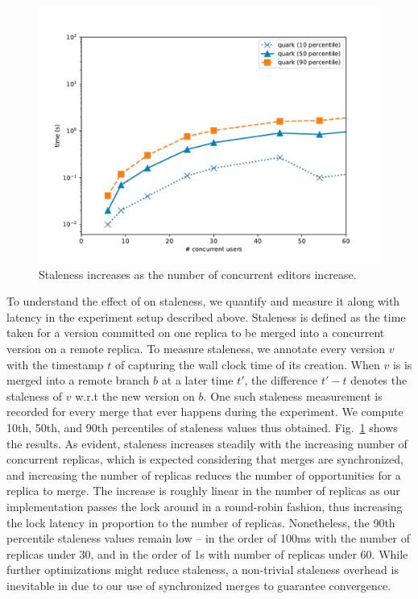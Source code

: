 \begin{figure}[ht]
  \centering
    \includegraphics[scale=0.4]{Figures/monkey_staleness}
\caption{Staleness increases as the number of concurrent editors
  increase.}
\label{fig:monkey-staleness}
  \vspace*{-0.2in}
\end{figure}

To understand the effect of \quark on
staleness, we quantify and measure it along with latency in the
experiment setup described above. Staleness is defined as the time
taken for a version committed on one replica to be merged into a
concurrent version on a remote replica. To measure staleness, we
annotate every version $v$ with the timestamp $t$ of capturing the
wall clock time of its creation. When $v$ is is merged into a remote
branch $b$ at a later time $t'$, the difference $t' - t$ denotes the
staleness of $v$ w.r.t the new version on $b$. One such staleness
measurement is recorded for every merge that ever happens during the
experiment. We compute 10th, 50th, and 90th percentiles of staleness
values thus obtained. Fig.~\ref{fig:monkey-staleness} shows the
results. As evident, staleness increases steadily with the increasing
number of concurrent replicas, which is expected considering that
merges are synchronized, and increasing the number of replicas reduces
the number of opportunities for a replica to merge. The increase is
roughly linear in the number of replicas as our implementation passes
the lock around in a round-robin fashion, thus increasing the lock
latency in proportion to the number of replicas. Nonetheless, the 90th
percentile staleness values remain low -- in the order of 100ms with
the number of replicas under 30, and in the order of 1s with number of
replicas under 60. While further optimizations might reduce staleness,
a non-trivial staleness overhead is inevitable in \quark due to our
use of synchronized merges to guarantee convergence. 

